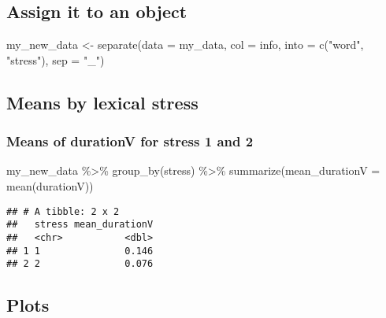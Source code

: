 \documentclass[
]{article}
\newenvironment{Shaded}{\begin{snugshade}}{\end{snugshade}}
\newcommand{\AttributeTok}[1]{\textcolor[rgb]{0.77,0.63,0.00}{#1}}
\newcommand{\FunctionTok}[1]{\textcolor[rgb]{0.00,0.00,0.00}{#1}}
\newcommand{\NormalTok}[1]{#1}
\newcommand{\OtherTok}[1]{\textcolor[rgb]{0.56,0.35,0.01}{#1}}
\newcommand{\SpecialCharTok}[1]{\textcolor[rgb]{0.00,0.00,0.00}{#1}}
\newcommand{\StringTok}[1]{\textcolor[rgb]{0.31,0.60,0.02}{#1}}
\begin{document}
\hypertarget{assign-it-to-an-object}{%
\subsection{Assign it to an object}\label{assign-it-to-an-object}}

\begin{Shaded}
\begin{Highlighting}[]
\NormalTok{my\_new\_data }\OtherTok{\textless{}{-}} \FunctionTok{separate}\NormalTok{(}\AttributeTok{data =}\NormalTok{ my\_data, }\AttributeTok{col =}\NormalTok{ info, }\AttributeTok{into =} \FunctionTok{c}\NormalTok{(}\StringTok{"word"}\NormalTok{, }\StringTok{"stress"}\NormalTok{), }\AttributeTok{sep =} \StringTok{"\_"}\NormalTok{)}
\end{Highlighting}
\end{Shaded}

\hypertarget{means-by-lexical-stress}{%
\subsection{Means by lexical stress}\label{means-by-lexical-stress}}

\hypertarget{means-of-durationv-for-stress-1-and-2}{%
\subsubsection{Means of durationV for stress 1 and
2}\label{means-of-durationv-for-stress-1-and-2}}

\begin{Shaded}
\begin{Highlighting}[]
\NormalTok{my\_new\_data }\SpecialCharTok{\%\textgreater{}\%}
  \FunctionTok{group\_by}\NormalTok{(stress) }\SpecialCharTok{\%\textgreater{}\%}
  \FunctionTok{summarize}\NormalTok{(}\AttributeTok{mean\_durationV =} \FunctionTok{mean}\NormalTok{(durationV))}
\end{Highlighting}
\end{Shaded}

\begin{verbatim}
## # A tibble: 2 x 2
##   stress mean_durationV
##   <chr>           <dbl>
## 1 1               0.146
## 2 2               0.076
\end{verbatim}

\hypertarget{plots}{%
\subsection{Plots}\label{plots}}
\end{document}
